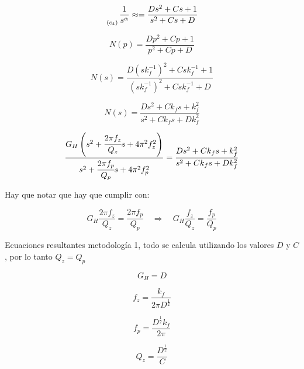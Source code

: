 		\begin{equation}
			\genfrac{}{}{0pt}{0}{}{_{(c_{4})}} \frac{1}{s^{\alpha}} \approx = \frac{D s^{2} + Cs + 1}{s^{2} + Cs + D}
		\end{equation}
		
		\begin{equation}
			N(p) = \frac{D p^{2} + Cp + 1}{p^{2} + Cp + D}
		\end{equation}
		
		\begin{equation}
			N(s) = \frac{D (sk_{f}^{-1})^{2} + Csk_{f}^{-1} + 1}{(sk_{f}^{-1})^{2} + Csk_{f}^{-1} + D}
		\end{equation}
		
		\begin{equation}
			N(s) = \frac{D s^{2} + C k_{f}s + k_{f}^{2}}{s^{2} + C k_{f}s + Dk_{f}^{2}}
		\end{equation}
		
		\begin{equation}
			\frac{G_{H} \left(  s^{2} + \cfrac{2 \pi f_{z}}{Q_{z}} s + 4 \pi^{2} f_{z}^{2} \right)}{s^{2} + \cfrac{2 \pi f_{p}}{Q_{p}}s + 4\pi^{2} f_{p}^{2} } = \frac{D s^{2} + C k_{f}s + k_{f}^{2}}{s^{2} + C k_{f}s + Dk_{f}^{2}}
		\end{equation}
		
		
		Hay que notar que hay que cumplir con:
		
		\begin{equation}
			G_{H} \frac{2 \pi f_{z}}{Q_{z}} = \frac{2 \pi f_{p}}{Q_{p}} \quad \Rightarrow \quad  G_{H} \frac{f_{z}}{Q_{z}} = \frac{f_{p}}{Q_{p}}
		\end{equation}
		
		Ecuaciones resultantes metodología 1, todo se calcula utilizando los valores $D$ y $C$, por lo tanto $Q_{z} = Q_{p}$
		
		\begin{equation}
			G_{H} = D
		\end{equation}
		
		\begin{equation}
			f_{z} = \frac{k_{f}}{2 \pi D^{\frac{1}{2}}}
		\end{equation}
		
		\begin{equation}
			f_{p} = \frac{D^{\frac{1}{2}} k_{f}}{2 \pi}
		\end{equation}
		
		\begin{equation}
			Q_{z} = \frac{D^{\frac{1}{2}}}{C}
		\end{equation}
		
